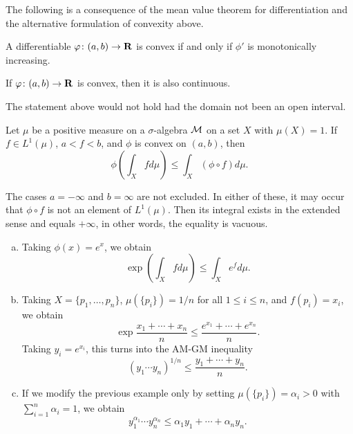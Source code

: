 The following is a consequence of the mean value theorem for differentiation and the alternative formulation of convexity above.

\begin{proposition}
  A differentiable $\varphi \colon (a,b) \rightarrow \mathbf{R}$ is convex if and only if $\phi'$ is monotonically increasing.
\end{proposition}

\begin{theorem}
  If $\varphi \colon (a,b) \rightarrow \mathbf{R}$ is convex, then it is also continuous.
\end{theorem}

\begin{remark}
  The statement above would not hold had the domain not been an open interval.
\end{remark}

\begin{theorem}
  Let $\mu$ be a positive measure on a $\sigma$-algebra $\mathcal{M}$ on a set $X$ with $\mu(X) = 1$. If $f \in L^1(\mu)$, $a < f < b$, and $\phi$ is convex on $(a,b)$, then
  \[
  \phi\left( \int_X f d\mu \right) \leq \int_X (\phi \circ f) d\mu.
  \]
\end{theorem}

\begin{remark}
  The cases $a = -\infty$ and $b = \infty$ are not excluded. In either of these, it may occur that $\phi \circ f$ is not an element of $L^1(\mu)$. Then its integral exists in the extended sense and equals $+\infty$, in other words, the equality is vacuous.
\end{remark}

\begin{example}
  \mbox{}
  \begin{enumerate}[(a)]
  \item Taking $\phi(x) = e^x$, we obtain
    \[
    \exp\left( \int_X f d\mu \right) \leq \int_X e^f d\mu.
    \]
  \item Taking $X = \{p_1, \dots, p_n\}$, $\mu(\{p_i\}) = 1/n$ for all $1 \leq i \leq n$, and $f(p_i) = x_i$, we obtain
    \[
    \exp\frac{x_1 + \cdots + x_n}{n} \leq \frac{e^{x_1} + \cdots + e^{x_n}}{n}.
    \]
    Taking $y_i = e^{x_i}$, this turns into the AM-GM inequality
    \[
    (y_1 \cdots y_n)^{1/n} \leq \frac{y_1 + \cdots + y_n}{n}.
    \]
  \item If we modify the previous example only by setting $\mu(\{p_i\}) = \alpha_i > 0$ with $\sum_{i=1}^n \alpha_i = 1$, we obtain
    \[
    y_1^{\alpha_1} \cdots y_n^{\alpha_n} \leq \alpha_1 y_1 + \cdots + \alpha_n y_n.
    \]
  \end{enumerate}
\end{example}

